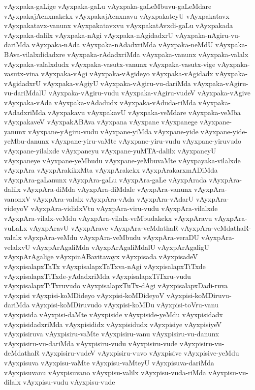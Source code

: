 {vAyxpaka-gaLige
vAyxpaka-gaLu
vAyxpaka-gaLeMbuvu-gaLeMdare
vAyxpakajAcnxnakekx
vAyxpakajAcnxnavu
vAyxpakateyU
vAyxpakatavx
vAyxpakatavx-vanunx
vAyxpakatavxvu
vAyxpakatAvxdi-gaLu
vAyxpakada
vAyxpaka-dalilx
vAyxpaka-nAgi
vAyxpaka-nAgidadxrU
vAyxpaka-nAgiru-vu-dariMda
vAyxpaka-nAda
vAyxpaka-nAdadxriMda
vAyxpaka-neMdU
vAyxpaka-BAva-vilalxdidadxre
vAyxpaka-rAdadxriMda
vAyxpaka-vanunx
vAyxpaka-valalx
vAyxpaka-valalxdudx
vAyxpaka-vasutx-vanunx
vAyxpaka-vasutx-vige
vAyxpaka-vasutx-vina
vAyxpaka-vAgi
vAyxpaka-vAgideyo
vAyxpaka-vAgidadx
vAyxpaka-vAgidadxrU
vAyxpaka-vAgiyU
vAyxpaka-vAgiru-vu-dariMda
vAyxpaka-vAgiru-vu-dariMdalU
vAyxpaka-vAgiru-vudu
vAyxpaka-vAgiru-vudeV
vAyxpaka-vAgive
vAyxpaka-vAda
vAyxpaka-vAdadudx
vAyxpaka-vAduda-riMda
vAyxpaka-vAdadxriMda
vAyxpakavu
vAyxpakavU
vAyxpaka-veMdare
vAyxpaka-veMba
vAyxpakaveV
vAyxpakABAva
vAyxpana
vAyxpane
vAyxpanege
vAyxpane-yanunx
vAyxpane-yAgiru-vudu
vAyxpane-yiMda
vAyxpane-yide
vAyxpane-yide-yeMbu-danunx
vAyxpane-yiru-vaMte
vAyxpane-yiru-vudu
vAyxpane-yiruvudo
vAyxpane-yilalxde
vAyxpaneyu
vAyxpane-yuMTA-dalilx
vAyxpaneyU
vAyxpaneye
vAyxpane-yeMbudu
vAyxpane-yeMbuvaMte
vAyxpayaka-vilalxde
vAyxpAra
vAyxpArakikxMta
vAyxpArakekx
vAyxpArakarxmADiMda
vAyxpAra-gaLanunx
vAyxpAra-gaLu
vAyxpAra-gaLe
vAyxpArada
vAyxpAra-dalilx
vAyxpAra-diMda
vAyxpAra-diMdale
vAyxpAra-vanunx
vAyxpAra-vanonxV
vAyxpAra-valalx
vAyxpAra-vAda
vAyxpAra-vAdarU
vAyxpAra-videyoV
vAyxpAra-vididxVtu
vAyxpAra-viru-vudu
vAyxpAra-vilalxde
vAyxpAra-vilalx-veMdu
vAyxpAra-vilalx-veMbudakekx
vAyxpAravu
vAyxpAra-vuLaLx
vAyxpAravU
vAyxpArave
vAyxpAra-veMdathaR
vAyxpAra-veMdathaR-valalx
vAyxpAra-veMdu
vAyxpAra-veMbudu
vAyxpAra-veraDU
vAyxpAra-velalxvU
vAyxpArAgaliMda
vAyxpArAgaliMdalU
vAyxpArAgaligU
vAyxpArAgalige
vAyxpinABavitavayx
vAyxpisada
vAyxpisadeV
vAyxpisalapxTaTx
vAyxpisalapxTaTxva-nAgi
vAyxpisalapxTiTxde
vAyxpisalapxTiTxde-yAdadxriMda
vAyxpisalapxTiTxru-vudu
vAyxpisalapxTiTxruvudo
vAyxpisalapxTuTx-dAgi
vAyxpisalapxDadi-ruva
vAyxpisi
vAyxpisi-koMDideyo
vAyxpisi-koMDideyoV
vAyxpisi-koMDiruvu-dariMda
vAyxpisi-koMDiruvudo
vAyxpisi-koMDu
vAyxpisi-toVru-vanu
vAyxpisida
vAyxpisi-daMte
vAyxpiside
vAyxpiside-yeMdu
vAyxpisidadx
vAyxpisidadxriMda
vAyxpisididx
vAyxpisidudx
vAyxpisiye
vAyxpisiyeV
vAyxpisiruva
vAyxpisiru-vaMte
vAyxpisiru-vanu
vAyxpisiru-vu-danunx
vAyxpisiru-vu-dariMda
vAyxpisiru-vudu
vAyxpisiru-vude
vAyxpisiru-vu-deMdathaR
vAyxpisiru-vudeV
vAyxpisiru-vuvo
vAyxpisive
vAyxpisive-yeMdu
vAyxpisuva
vAyxpisu-vaMte
vAyxpisu-vaMteyU
vAyxpisuva-dariMda
vAyxpisuvanu
vAyxpisuvano
vAyxpisu-valilx
vAyxpisu-vuda-riMda
vAyxpisu-vu-dilalx
vAyxpisu-vudu
vAyxpisu-vude
}
